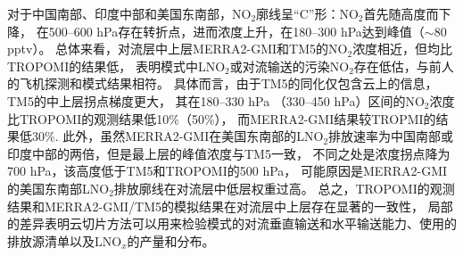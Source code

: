 对于中国南部、印度中部和美国东南部，NO$_2$廓线呈“C”形：NO$_2$首先随高度而下降，
在500--600 hPa存在转折点，进而浓度上升，在180--300 hPa达到峰值（$\sim$80 pptv）。
总体来看，对流层中上层MERRA2-GMI和TM5的NO$_2$浓度相近，但均比TROPOMI的结果低，
表明模式中LNO$_2$或对流输送的污染NO$_2$存在低估，与前人的飞机探测和模式结果相符\citep{Laughner.2019a}。
具体而言，由于TM5的同化仅包含云上的信息，TM5的中上层拐点梯度更大，
其在180--330 hPa （330--450 hPa）区间的NO$_2$浓度比TROPOMI的观测结果低10\%（50\%），
而MERRA2-GMI结果较TROPMI的结果低30\%.
此外，虽然MERRA2-GMI在美国东南部的LNO$_2$排放速率为中国南部或印度中部的两倍，但是最上层的峰值浓度与TM5一致，
不同之处是浓度拐点降为700 hPa，该高度低于TM5和TROPOMI的500 hPa，
可能原因是MERRA2-GMI的美国东南部LNO$_2$排放廓线在对流层中低层权重过高。
总之，TROPOMI的观测结果和MERRA2-GMI/TM5的模拟结果在对流层中上层存在显著的一致性，
局部的差异表明云切片方法可以用来检验模式的对流垂直输送和水平输送能力、使用的排放源清单以及LNO$_x$的产量和分布。


